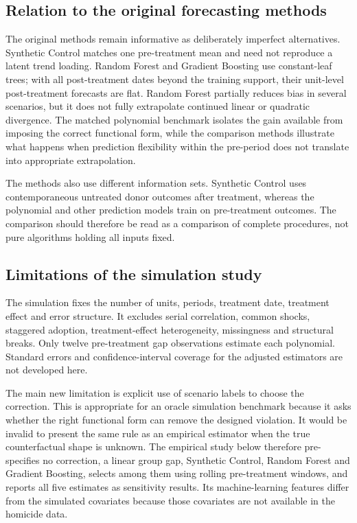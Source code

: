 \documentclass[11pt,a4paper]{article}
\begin{document}
\subsection{Relation to the original forecasting methods}
The original methods remain informative as deliberately imperfect alternatives. Synthetic Control matches one pre-treatment mean and need not reproduce a latent trend loading. Random Forest and Gradient Boosting use constant-leaf trees; with all post-treatment dates beyond the training support, their unit-level post-treatment forecasts are flat. Random Forest partially reduces bias in several scenarios, but it does not fully extrapolate continued linear or quadratic divergence. The matched polynomial benchmark isolates the gain available from imposing the correct functional form, while the comparison methods illustrate what happens when prediction flexibility within the pre-period does not translate into appropriate extrapolation.

The methods also use different information sets. Synthetic Control uses contemporaneous untreated donor outcomes after treatment, whereas the polynomial and other prediction models train on pre-treatment outcomes. The comparison should therefore be read as a comparison of complete procedures, not pure algorithms holding all inputs fixed.

\subsection{Limitations of the simulation study}
The simulation fixes the number of units, periods, treatment date, treatment effect and error structure. It excludes serial correlation, common shocks, staggered adoption, treatment-effect heterogeneity, missingness and structural breaks. Only twelve pre-treatment gap observations estimate each polynomial. Standard errors and confidence-interval coverage for the adjusted estimators are not developed here.

The main new limitation is explicit use of scenario labels to choose the correction. This is appropriate for an oracle simulation benchmark because it asks whether the right functional form can remove the designed violation. It would be invalid to present the same rule as an empirical estimator when the true counterfactual shape is unknown. The empirical study below therefore pre-specifies no correction, a linear group gap, Synthetic Control, Random Forest and Gradient Boosting, selects among them using rolling pre-treatment windows, and reports all five estimates as sensitivity results. Its machine-learning features differ from the simulated covariates because those covariates are not available in the homicide data.
\end{document}
